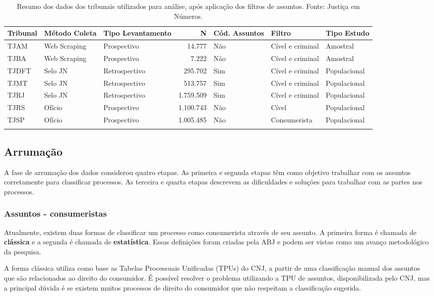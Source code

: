 \documentclass[]{report}
\begin{document}
\begin{longtable}{lllrlll}
\caption{Resumo dos dados dos tribunais utilizados para análise, após aplicação dos filtros de assuntos. Fonte: Justiça em Números.} \\
  \hline
Tribunal & Método Coleta & Tipo Levantamento & N & Cód. Assuntos & Filtro & Tipo Estudo \\
  \hline
TJAM & Web Scraping & Prospectivo & 14.777 & Não & Cível e criminal & Amostral \\
  TJBA & Web Scraping & Prospectivo & 7.222 & Não & Cível e criminal & Amostral \\
  TJDFT & Selo JN & Retrospectivo & 295.702 & Sim & Cível e criminal & Populacional \\
  TJMT & Selo JN & Retrospectivo & 513.757 & Sim & Cível e criminal & Populacional \\
  TJRJ & Selo JN & Retrospectivo & 1.759.509 & Sim & Cível e criminal & Populacional \\
  TJRS & Ofício & Prospectivo & 1.100.743 & Não & Cível & Populacional \\
  TJSP & Ofício & Prospectivo & 1.005.485 & Não & Consumerista & Populacional \\
   \hline
\hline
\label{tab:tribunais}
\end{longtable}

\subsection{Arrumação}\label{arrumacao}

A fase de arrumação dos dados considerou quatro etapas. As primeira e
segunda etapas têm como objetivo trabalhar com os assuntos corretamente
para classificar processos. As terceira e quarta etapas descrevem as
dificuldades e soluções para trabalhar com as partes nos processos.

\subsubsection{Assuntos - consumeristas}\label{assuntos}

Atualmente, existem duas formas de classificar um processo como
consumerista através de seu assunto. A primeira forma é chamada de
\textbf{clássica} e a segunda é chamada de \textbf{estatística}. Essas
definições foram criadas pela ABJ e podem ser vistas como um avanço
metodológico da pesquisa.

A forma clássica utiliza como base as Tabelas Processuais Unificadas
(TPUs) do CNJ, a partir de uma classificação manual dos assuntos que são
relacionados ao direito do consumidor. É possível resolver o problema
utilizando a TPU de assuntos, disponibilizada pelo CNJ, mas a principal
dúvida é se existem muitos processos de direito do consumidor que não
respeitam a classificação sugerida.
\end{document}
